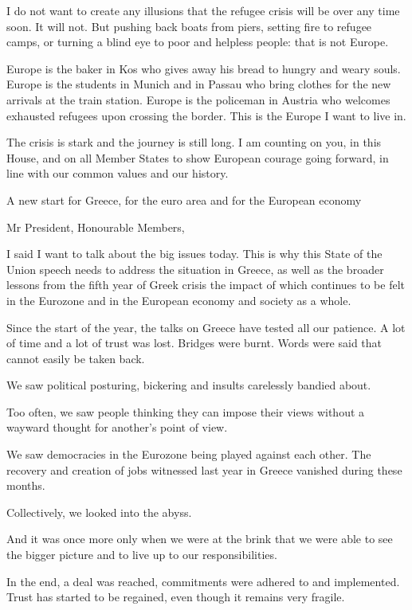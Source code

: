\documentclass[a4paper,11pt]{article}
\begin{document}
I do not want to create any illusions that the refugee crisis will be over any time soon. It will not. But pushing back boats from piers, setting fire to refugee camps, or turning a blind eye to poor and helpless people: that is not Europe.

Europe is the baker in Kos who gives away his bread to hungry and weary souls. Europe is the students in Munich and in Passau who bring clothes for the new arrivals at the train station. Europe is the policeman in Austria who welcomes exhausted refugees upon crossing the border. This is the Europe I want to live in.

The crisis is stark and the journey is still long. I am counting on you, in this House, and on all Member States to show European courage going forward, in line with our common values and our history.

 

A new start for Greece, for the euro area and for the European economy

Mr President, Honourable Members,

I said I want to talk about the big issues today. This is why this State of the Union speech needs to address the situation in Greece, as well as the broader lessons from the fifth year of Greek crisis the impact of which continues to be felt in the Eurozone and in the European economy and society as a whole.

Since the start of the year, the talks on Greece have tested all our patience. A lot of time and a lot of trust was lost. Bridges were burnt. Words were said that cannot easily be taken back.

We saw political posturing, bickering and insults carelessly bandied about.

Too often, we saw people thinking they can impose their views without a wayward thought for another's point of view.

We saw democracies in the Eurozone being played against each other. The recovery and creation of jobs witnessed last year in Greece vanished during these months.

Collectively, we looked into the abyss.

And it was once more only when we were at the brink that we were able to see the bigger picture and to live up to our responsibilities.

In the end, a deal was reached, commitments were adhered to and implemented. Trust has started to be regained, even though it remains very fragile.
\end{document}
